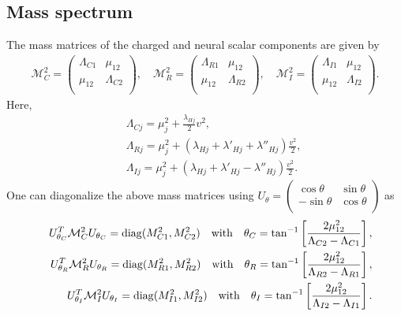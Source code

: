 \documentclass[aps, a4paper,superscriptaddress,12pt,preprintnumbers,floatfix,nofootinbib,amsmath,amssymb]{revtex4}
\newcommand{\nn}{\nonumber}
\begin{document}
\subsection{Mass spectrum}
The mass matrices of the charged and neural scalar components are given by
\begin{align}
{\mathcal M}^2_C =
	\begin{pmatrix}
		 \Lambda_{C1}	& \mu_{12}	\\
		 \mu_{12}	& \Lambda_{C2}	\\
	\end{pmatrix}, \quad
{\mathcal M}^2_R =
	\begin{pmatrix}
		 \Lambda_{R1}	& \mu_{12}	\\
		 \mu_{12}	& \Lambda_{R2}	\\
	\end{pmatrix}, \quad
{\mathcal M}^2_I =
	\begin{pmatrix}
		 \Lambda_{I1}	& \mu_{12}	\\
		 \mu_{12}	& \Lambda_{I2}	\\
	\end{pmatrix}.
\end{align}
Here, 
\begin{eqnarray}
&&\Lambda_{Cj} = \mu_{j}^2  + \frac{ \lambda_{ Hj}}{2} v^2,\nn\\
&&\Lambda_{Rj} = \mu_{j}^2  +  \left(\lambda_{Hj} + \lambda'_{Hj} + \lambda''_{Hj}\right)\frac{v^2}{2},\nn\\
&&\Lambda_{Ij} = \mu_{j}^2  +  \left(\lambda_{Hj} + \lambda'_{Hj} - \lambda''_{Hj}\right)\frac{v^2}{2}.
\end{eqnarray}
One can diagonalize the above mass matrices using
$
U_\theta
	=
	\begin{pmatrix}
		 \cos{\theta}	& \sin{\theta}	\\
		 -\sin{\theta}	& \cos{\theta}	\\
	\end{pmatrix}
$ as
\begin{eqnarray}
&& U_{\theta_C}^T {\mathcal M}^2_{C} U_{\theta_C} = {\rm{diag}}(M^2_{{C1}},M^2_{{C2}}) \quad {\rm with} \quad
\theta_C = \tan^{-1}\left[\frac{2\mu^2_{12}}{\Lambda_{C2}-\Lambda_{C1}}\right],\nn\\
&& U_{\theta_R}^T {\mathcal M}^2_{R} U_{\theta_R} = {\rm{diag}}(M^2_{{R1}},M^2_{{R2}}) \quad {\rm with} \quad
\theta_R = \tan^{-1}\left[\frac{2\mu^2_{12}}{\Lambda_{R2}-\Lambda_{R1}}\right],\nn\\
&& U_{\theta_I}^T {\mathcal M}^2_{I} U_{\theta_I} = {\rm{diag}}(M^2_{{I1}},M^2_{{I2}}) \quad {\rm with} \quad
\theta_I = \tan^{-1}\left[\frac{2\mu^2_{12}}{\Lambda_{I2}-\Lambda_{I1}}\right].
\end{eqnarray}
\end{document}
